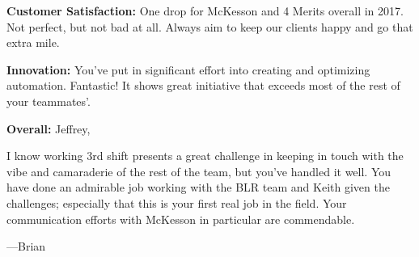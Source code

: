 


\begin{cvparagraph}
    {\bfseries Customer Satisfaction:} One drop for McKesson and 4 Merits overall in 2017. 
    Not perfect, but not bad at all. 
    Always aim to keep our clients happy and go that extra mile.

    {\bfseries Innovation:} You've put in significant effort into creating and optimizing automation. 
    Fantastic! 
    It shows great initiative that exceeds most of the rest of your teammates'.

    {\bfseries Overall:}
Jeffrey,

I know working 3rd shift presents a great challenge in keeping in touch with the vibe and camaraderie of the rest of the team, but you've handled it well.
You have done an admirable job working with the BLR team and Keith given the challenges; especially that this is your first real job in the field.
Your communication efforts with McKesson in particular are commendable.


---Brian
\end{cvparagraph}

